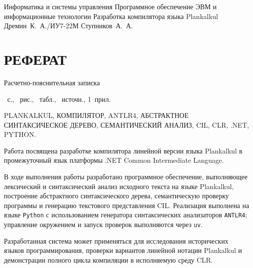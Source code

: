 \documentclass{bmstu}
\begin{document}
\makecourseworktitle
{Информатика и системы управления}
{Программное обеспечение ЭВМ и информационные технологии}
{Разработка компилятора языка Plankalkul}
{Дремин~К.~А./ИУ7-22М}
{Ступников~А.~А.}
{}

\newenvironment{essay2}[1]
{
	\chapter*{РЕФЕРАТ}
	
	Расчетно-пояснительная записка \begin{NoHyper}\pageref{LastPage}\end{NoHyper}~с., \totfig~рис., \tottab~табл., \thetotbibentries~источн., 1~прил.
	
	\MakeUppercase{#1} \par
}{}

\setcounter{page}{3}
\begin{essay2}{Plankalkul, компилятор, ANTLR4, абстрактное синтаксическое дерево, семантический анализ, CIL, CLR, .NET, Python.}
	Работа посвящена разработке компилятора линейной версии языка Plankalkul в промежуточный язык платформы .NET Common Intermediate Language.
	
	В ходе выполнения работы разработано программное обеспечение, выполняющее лексический и синтаксический анализ исходного текста на языке Plankalkul, построение абстрактного синтаксического дерева, семантическую проверку программы и генерацию текстового представления CIL.
	Реализация выполнена на языке \texttt{Python} с использованием генератора синтаксических анализаторов \texttt{ANTLR4}; управление окружением и запуск проверок выполняются через \texttt{uv}.
	
	Разработанная система может применяться для исследования исторических языков программирования, проверки вариантов линейной нотации Plankalkul и демонстрации полного цикла компиляции в исполняемую среду CLR.
\end{essay2}
\maketableofcontents








{}
\printbibliography[title=СПИСОК ИСПОЛЬЗОВАННЫХ ИСТОЧНИКОВ]


\end{document}
